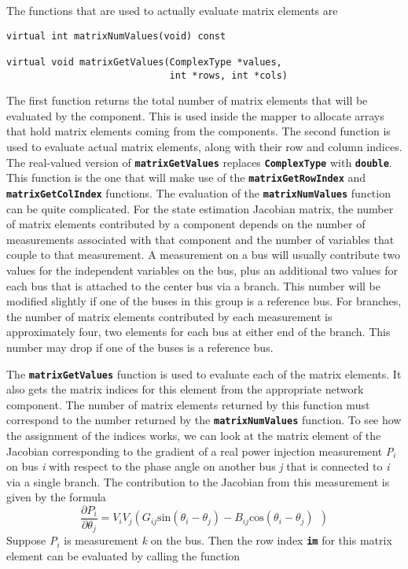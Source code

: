 The functions that are used to actually evaluate matrix elements are

{
\color{red}
\begin{Verbatim}[fontseries=b]
virtual int matrixNumValues(void) const

virtual void matrixGetValues(ComplexType *values,
                             int *rows, int *cols)
\end{Verbatim}
}

The first function returns the total number of matrix elements that will be evaluated by the component. This is used inside the mapper to allocate arrays that hold matrix elements coming from the components. The second function is used to evaluate actual matrix elements, along with their row and column indices. The real-valued version of \texttt{\textbf{matrixGetValues}} replaces \texttt{\textbf{ComplexType}} with \texttt{\textbf{double}}. This function is the one that will make use of the \texttt{\textbf{matrixGetRowIndex}} and \texttt{\textbf{matrixGetColIndex}} functions. The evaluation of the \texttt{\textbf{matrixNumValues}} function can be quite complicated. For the state estimation Jacobian matrix, the number of matrix elements contributed by a component depends on the number of measurements associated with that component and the number of variables that couple to that measurement. A measurement on a bus will usually contribute two values for the independent variables on the bus, plus an additional two values for each bus that is attached to the center bus via a branch. This number will be modified slightly if one of the buses in this group is a reference bus. For branches, the number of matrix elements contributed by each measurement is approximately four, two elements for each bus at either end of the branch. This number may drop if one of the buses is a reference bus.

The \texttt{\textbf{matrixGetValues}} function is used to evaluate each of the matrix elements. It also gets the matrix indices for this element from the appropriate network component. The number of matrix elements returned by this function must correspond to the number returned by the \texttt{\textbf{matrixNumValues}} function. To see how the assignment of the indices works, we can look at the matrix element of the Jacobian corresponding to the gradient of a real power injection measurement \textit{P${}_{i}$} on bus \textit{i} with respect to the phase angle on another bus \textit{j} that is connected to \textit{i} via a single branch. The contribution to the Jacobian from this measurement is given by the formula\[\frac{\partial P_i}{\partial {\theta }_j}=V_iV_j(G_{ij}{\mathrm{sin} \left({\theta }_i-{\theta }_j\right)-B_{ij}{\mathrm{cos} ({\theta }_i-{\theta }_j)\ }\ })\] 
Suppose \textit{P${}_{i}$} is measurement \textit{k} on the bus. Then the row index \texttt{\textbf{im}} for this matrix element can be evaluated by calling the function

